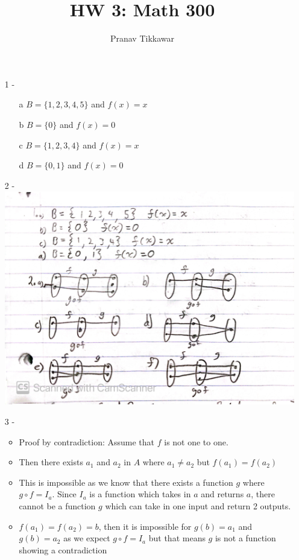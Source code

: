 \documentclass{article}
\author{Pranav Tikkawar}
\title{HW 3: Math 300}
\begin{document}
\maketitle
\begin{itemize}
    \item [1] - \begin{itemize}
        \item [a] $B = \{1,2,3,4,5\}$ and $f(x) = x$
        \item [b] $B = \{0\} $ and $f(x) =0$ 
        \item [c] $B = \{1, 2, 3, 4\}$ and $f(x) = x$
        \item [d] $B = \{0,1\}$ and $f(x) = 0$
    \end{itemize}
    \item [2] - \includegraphics[scale=.1]{IMG_2640.JPG}
    \item [3] - \begin{itemize}
        \item Proof by contradiction: Assume that $f$ is not one to one.
        \item Then there exists $a_1$ and $a_2$ in $A$ where $a_1 \neq a_2$ but $f(a_1) = f(a_2)$ 
        \item This is impossible as we know that there exists a function $g$ where $g \circ f = I_a$. Since $I_a$ is a function which takes in $a$ and returns $a$, there cannot be a function $g$ which can take in one input and return 2 outputs. 
        \item $f(a_1) = f(a_2) =b$, then it is impossible for $g(b) = a_1$ and $g(b) = a_2$ as we expect $g \circ f = I_a$ but that means $g$ is not a function showing a contradiction 

\end{itemize}
\end{itemize}
\end{document}
